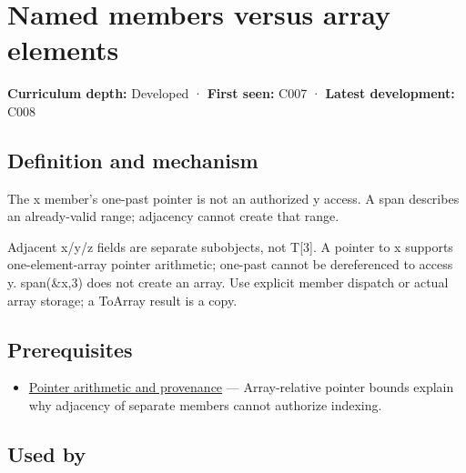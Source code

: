 \hypertarget{appendix-3f7e15effba6}{}\label{referencestart:appendix-3f7e15effba6}
\section{Named members versus array elements}\label{appendix-3f7e15effba6-named-members-versus-array-elements}

\hypertarget{appendix-3f7e15effba6-named-members-versus-array-elements}{}

\textbf{Curriculum depth:} Developed · \textbf{First seen:} C007 · \textbf{Latest development:} C008

\begin{allmightroledefinition}

\subsection{Definition and mechanism}\label{appendix-3f7e15effba6-definition-and-mechanism}

\hypertarget{appendix-3f7e15effba6-definition-and-mechanism}{}

The x member's one-past pointer is not an authorized y access. A span describes an already-valid range; adjacency cannot create that range.

\end{allmightroledefinition}

Adjacent x/y/z fields are separate subobjects, not T{[}3{]}. A pointer to x supports one-element-array pointer arithmetic; one-past cannot be dereferenced to access y. span(\&x,3) does not create an array. Use explicit member dispatch or actual array storage; a ToArray result is a copy.

\subsection{Prerequisites}\label{appendix-3f7e15effba6-prerequisites}

\hypertarget{appendix-3f7e15effba6-prerequisites}{}

\begin{itemize}
\tightlist
\item
  \hyperref[appendix-6af5921bc853]{Pointer arithmetic and provenance} --- Array-relative pointer bounds explain why adjacency of separate members cannot authorize indexing.
\end{itemize}

\subsection{Used by}\label{appendix-3f7e15effba6-used-by}

